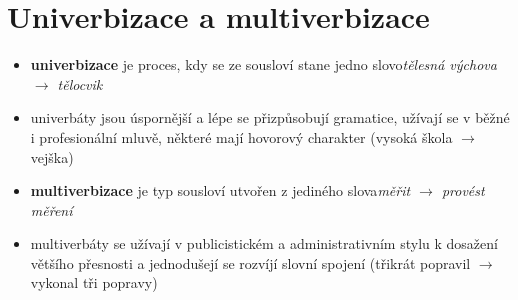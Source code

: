 \documentclass{memoir}
\begin{document}
\section*{Univerbizace a multiverbizace}
	\begin{itemize}
		\item \textbf{univerbizace} je proces, kdy se ze sousloví stane jedno slovo\hfill\textit{tělesná výchova $\rightarrow$ tělocvik}
		\item univerbáty jsou úspornější a lépe se přizpůsobují gramatice, užívají se v běžné i profesionální mluvě, některé mají hovorový charakter (vysoká škola $\rightarrow$ vejška)
		\item \textbf{multiverbizace} je typ sousloví utvořen z jediného slova\hfill\textit{měřit $\rightarrow$ provést měření}
		\item multiverbáty se užívají v publicistickém a administrativním stylu k dosažení většího přesnosti a jednodušejí se rozvíjí slovní spojení (třikrát popravil $\rightarrow$ vykonal tři popravy)
	\end{itemize}
\end{document}
